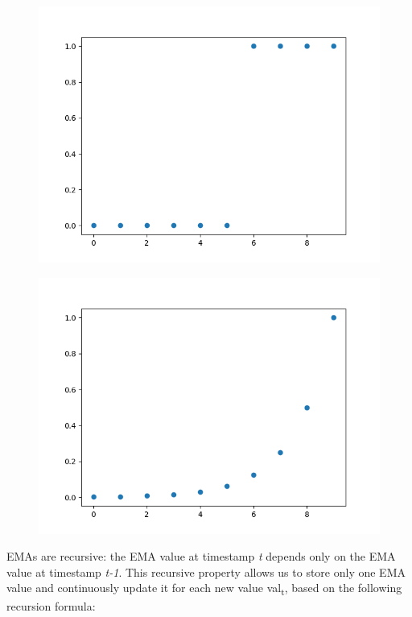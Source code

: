 \begin{figure}[!htb]
\centering
\begin{minipage}{.5\textwidth}
  \centering
      \includegraphics[scale=0.5]{figures/window-weights.png}
  \label{fig:window-weights}
\end{minipage}%
\begin{minipage}{.5\textwidth}
  \centering
      \includegraphics[scale=0.5]{figures/ema-weights.png}
  \label{fig:ema-weights}
\end{minipage}
\end{figure}


EMAs are recursive: the EMA value at timestamp \textit{t} depends only on the EMA value at timestamp \textit{t-1}. This recursive property allows us to store only one EMA value and continuously update it for each new value val\textsubscript{t}, based on the following recursion formula:

